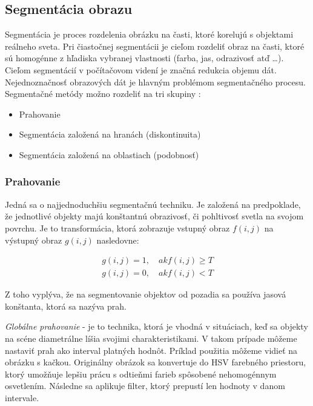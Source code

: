 \subsection{Segmentácia obrazu}
Segmentácia je proces rozdelenia obrázku na časti, ktoré korelujú s objektami reálneho sveta. Pri čiastočnej segmentácii je cieľom rozdeliť obraz na časti, ktoré sú homogénne z hľadiska vybranej vlastnosti (farba, jas, odrazivosť atď …). Cieľom segmentácií v počítačovom videní je značná redukcia objemu dát. Nejednoznačnosť obrazových dát je hlavným problémom segmentačného procesu. Segmentačné metódy možno rozdeliť na tri skupiny \cite{pocitacove_videnie_v_praxi}:


\begin{itemize}
\item Prahovanie
\item Segmentácia založená na hranách (diskontinuita)
\item Segmentácia založená na oblastiach (podobnosť)
\end{itemize}

\subsubsection{Prahovanie}
\label{sec:treasholding}
Jedná sa o najjednoduchšiu segmentačnú techniku. Je založená na predpoklade, že jednotlivé objekty majú konštantnú obrazivosť, či pohltivosť svetla na svojom povrchu. Je to transformácia, ktorá zobrazuje vstupný obraz $f(i, j)$ na výstupný obraz $g(i, j)$ nasledovne: \cite{fit_trasholding} 


\begin{equation}
    \begin{gathered}
        g (i{,}j)=1 {,}\quad {ak} f(i{,}j)\ge T\\ 
        g (i{,}j)=0 {,}\quad {ak} f(i{,}j)  < T
    \end{gathered}
\end{equation}


Z toho vyplýva, že na segmentovanie objektov od pozadia sa používa jasová konštanta, ktorá sa nazýva prah. \cite{pocitacove_videnie_v_praxi}


\textit{Globálne prahovanie} - je to technika, ktorá je vhodná v situáciach, keď sa objekty na scéne diametrálne líšia svojimi charakteristikami. V takom prípade môžeme nastaviť prah ako interval platných hodnôt. Príklad použitia môžeme vidieť na obrázku s kačkou. Originálny obrázok sa konvertuje do HSV farebného priestoru, ktorý umožňuje lepšiu prácu s odtieňmi farieb spôsobené nehomogénnym osvetlením. Následne sa aplikuje filter, ktorý prepustí len hodnoty v danom intervale. \cite{fit_trasholding}\cite{Learning_openCV}

